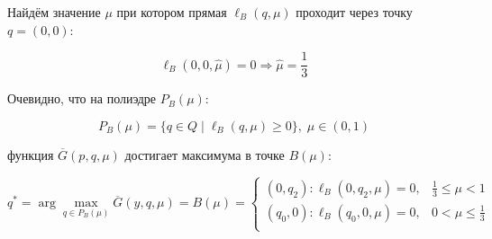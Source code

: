 \begin{flushleft}
	Найдём значение $\mu$ при котором прямая $\ell_B(q, \mu)$ проходит через точку
	$q=(0,0)$:
	
	$$\ell_B(0,0,\hat \mu) = 0
	\Rightarrow \hat \mu = \frac{1}{3}$$	
	
	Очевидно, что на полиэдре $P_B(\mu):$
		
	$$P_B(\mu)=\{q \in Q \; | 
	\;  \ell_B(q, \mu) \geqslant 0 \}, \; \mu \in (0,1)$$
	
	функция $\overline{G}(p,q,\mu)$ достигает максимума в точке $B(\mu):$
	
	$$
	q^* = \arg \max \limits_{q\in P_B(\mu)} \overline G(y,q,\mu) = B(\mu)=
	\begin{cases}
		(0, q_2) : \ell_B(0,q_2,\mu)=0, & \frac{1}{3} \leqslant \mu < 1 \\
		(q_0, 0) : \ell_B(q_0,0,\mu)=0, & 0 < \mu \leqslant \frac{1}{3} \\
	\end{cases}	
	$$
	

\end{flushleft}
